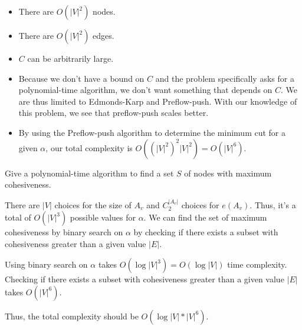 \begin{itemize}
\item There are $O(|V|^2)$ nodes.
\item There are $O(|V|^2)$ edges.
\item $C$ can be arbitrarily large.
\item Because we don't have a bound on $C$ and the problem specifically asks for a polynomial-time algorithm, we don't want something that depends on $C$. We are thus limited to Edmonds-Karp and Preflow-push. With our knowledge of this problem, we see that preflow-push scales better. 
\item By using the Preflow-push algorithm to determine the minimum cut for a given $\alpha$, our total complexity is $O((|V|^2)^2 |V|^2)=O(|V|^6)$.
\end{itemize}


Give a polynomial-time algorithm to find a set $S$ of nodes with maximum cohesiveness.


There are $|V|$ choices for the size of $A_v$ and $C_{2}^{|A_v|}$ choices for $e(A_v)$. Thus, it's a total of $O(|V|^3)$ possible values for $\alpha$. We can find the set of maximum cohesiveness by binary search on $\alpha$ by checking if there exists a subset with cohesiveness greater than a given value $|E|$.



Using binary search on $\alpha$ takes $O(\log |V|^3) = O(\log |V|)$ time complexity. Checking if there exists a subset with cohesiveness greater than a given value $|E|$ takes $O(|V|^6)$. 

Thus, the total complexity should be $O(\log|V| * |V|^6)$.
